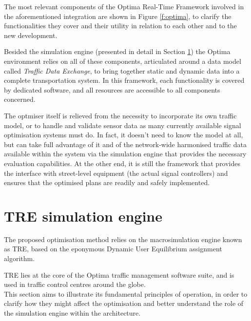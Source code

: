 The most relevant components of the Optima Real-Time Framework involved in the aforementioned integration are shown in Figure \ref{f:optima}, to clarify the functionalities they cover and their utility in relation to each other and to the new development.


Besided the simulation engine (presented in detail in Section \ref{s:TRE}) the Optima environment relies on all of these components, articulated around a data model called \emph{Traffic Data Exchange}, to bring together static and dynamic data into a complete transportation system.
In this framework, each functionality is covered by dedicated software, and all resources are accessible to all components concerned.

The optmiser itself is relieved from the necessity to incorporate its own traffic model, or to handle and validate sensor data as many currently available signal optimisation systems must do. In fact, it doesn't need to know the model at all, but can take full advantage of it and of the network-wide harmonised traffic data available within the system via the simulation engine that provides the necessary evaluation capabilities. At the other end, it is still the framework that provides the interface with street-level equipment (the actual signal controllers) and ensures that the optimised plans are readily and safely implemented.

\section{TRE simulation engine} \label{s:TRE}
The proposed optimisation method relies on the macrosimulation engine known as TRE, based on the eponymous Dynamic User Equilibrium assignment algorithm.

TRE lies at the core of the Optima traffic management software suite, and is used in traffic control centres around the globe.\\
This section aims to illustrate its fundamental principles of operation, in order to clarify how they might affect the optimisation and better understand the role of the simulation engine within the architecture.

